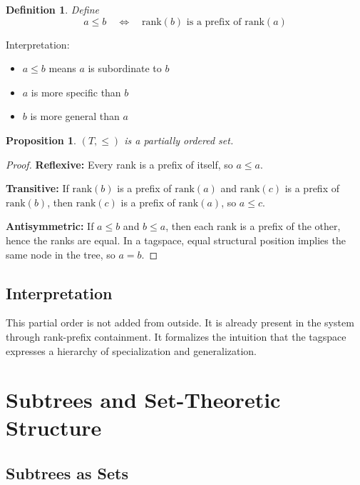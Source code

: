 \documentclass{article}
\newtheorem{definition}{Definition}[section]
\newtheorem{proposition}{Proposition}[section]
\begin{document}
\begin{definition}
Define
\[
a \leq b \quad \Longleftrightarrow \quad \mathrm{rank}(b)
\text{ is a prefix of } \mathrm{rank}(a)
\]
\end{definition}

Interpretation:

\begin{itemize}
    \item $a \leq b$ means $a$ is subordinate to $b$
    \item $a$ is more specific than $b$
    \item $b$ is more general than $a$
\end{itemize}

\begin{proposition}
$(T,\leq)$ is a partially ordered set.
\end{proposition}

\begin{proof}
\textbf{Reflexive:} Every rank is a prefix of itself, so $a \leq a$.

\textbf{Transitive:} If $\mathrm{rank}(b)$ is a prefix of
$\mathrm{rank}(a)$ and $\mathrm{rank}(c)$ is a prefix of
$\mathrm{rank}(b)$, then $\mathrm{rank}(c)$ is a prefix of
$\mathrm{rank}(a)$, so $a \leq c$.

\textbf{Antisymmetric:} If $a \leq b$ and $b \leq a$, then each rank is a
prefix of the other, hence the ranks are equal. In a tagspace, equal
structural position implies the same node in the tree, so $a=b$.
\end{proof}

\subsection{Interpretation}

This partial order is not added from outside. It is already present in the
system through rank-prefix containment. It formalizes the intuition that
the tagspace expresses a hierarchy of specialization and generalization.

\section{Subtrees and Set-Theoretic Structure}

\subsection{Subtrees as Sets}
\end{document}
